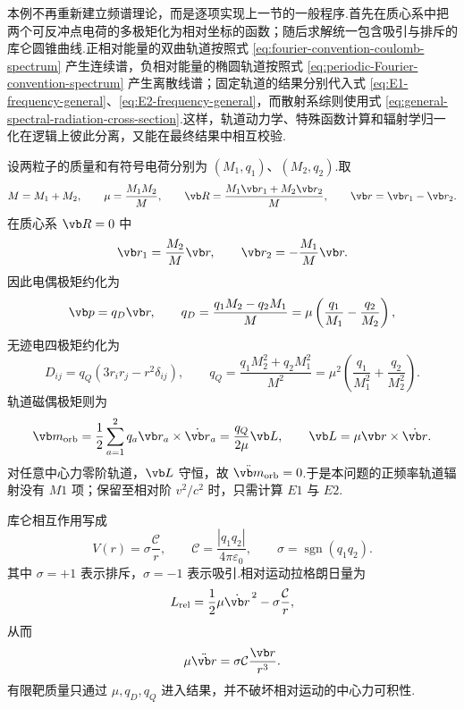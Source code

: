 本例不再重新建立频谱理论，而是逐项实现上一节的一般程序.首先在质心系中把两个可反冲点电荷的多极矩化为相对坐标的函数；随后求解统一包含吸引与排斥的库仑圆锥曲线.正相对能量的双曲轨道按照式 \eqref{eq:fourier-convention-coulomb-spectrum} 产生连续谱，负相对能量的椭圆轨道按照式 \eqref{eq:periodic-Fourier-convention-spectrum} 产生离散线谱；固定轨道的结果分别代入式 \eqref{eq:E1-frequency-general}、\eqref{eq:E2-frequency-general}，而散射系综则使用式 \eqref{eq:general-spectral-radiation-cross-section}.这样，轨道动力学、特殊函数计算和辐射学归一化在逻辑上彼此分离，又能在最终结果中相互校验.

设两粒子的质量和有符号电荷分别为 $(M_1,q_1)$、$(M_2,q_2)$.取
\begin{equation}
 M=M_1+M_2,
 \qquad
 \mu=\frac{M_1M_2}{M},
 \qquad
 \vb R=\frac{M_1\vb r_1+M_2\vb r_2}{M},
 \qquad
 \vb r=\vb r_1-\vb r_2.
 \label{eq:two-body-center-relative-coordinates-spectrum}
\end{equation}
在质心系 $\vb R=0$ 中
\begin{equation}
 \vb r_1=\frac{M_2}{M}\vb r,
 \qquad
 \vb r_2=-\frac{M_1}{M}\vb r.
 \label{eq:two-body-particle-coordinates-spectrum}
\end{equation}
因此电偶极矩约化为
\begin{equation}
 \vb p=q_D\vb r,
 \qquad
 q_D=\frac{q_1M_2-q_2M_1}{M}
 =\mu\left(\frac{q_1}{M_1}-\frac{q_2}{M_2}\right),
 \label{eq:effective-dipole-charge}
\end{equation}
无迹电四极矩约化为
\begin{equation}
 D_{ij}=q_Q\left(3r_ir_j-r^2\delta_{ij}\right),
 \qquad
 q_Q=\frac{q_1M_2^2+q_2M_1^2}{M^2}
 =\mu^2\left(\frac{q_1}{M_1^2}+\frac{q_2}{M_2^2}\right).
 \label{eq:effective-quadrupole-charge}
\end{equation}
轨道磁偶极矩则为
\begin{equation}
 \vb m_{\mathrm{orb}}
 =\frac{1}{2}\sum_{a=1}^2q_a\vb r_a\times\dot{\vb r}_a
 =\frac{q_Q}{2\mu}\vb L,
 \qquad
 \vb L=\mu\vb r\times\dot{\vb r}.
 \label{eq:orbital-magnetic-moment-two-body}
\end{equation}
对任意中心力零阶轨道，$\vb L$ 守恒，故 $\ddot{\vb m}_{\mathrm{orb}}=0$.于是本问题的正频率轨道辐射没有 $M1$ 项；保留至相对阶 $v^2/c^2$ 时，只需计算 $E1$ 与 $E2$.

库仑相互作用写成
\begin{equation}
 V(r)=\sigma\frac{\mathcal C}{r},
 \qquad
 \mathcal C=\frac{|q_1q_2|}{4\pi\varepsilon_0},
 \qquad
 \sigma=\operatorname{sgn}(q_1q_2).
 \label{eq:two-body-unified-definitions}
\end{equation}
其中 $\sigma=+1$ 表示排斥，$\sigma=-1$ 表示吸引.相对运动拉格朗日量为
\begin{equation}
 L_{\mathrm{rel}}=\frac{1}{2}\mu\dot{\vb r}^{\,2}-\sigma\frac{\mathcal C}{r},
\end{equation}
从而
\begin{equation}
 \mu\ddot{\vb r}=\sigma\mathcal C\frac{\vb r}{r^3}.
 \label{eq:unified-coulomb-relative-motion}
\end{equation}
有限靶质量只通过 $\mu,q_D,q_Q$ 进入结果，并不破坏相对运动的中心力可积性.

